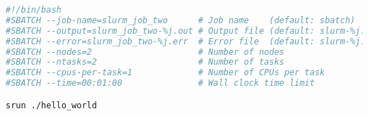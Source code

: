 \begin{lstlisting}[language=bash, caption=two nodes and tasks sbatch script]
#!/bin/bash
#SBATCH --job-name=slurm_job_two      # Job name    (default: sbatch)
#SBATCH --output=slurm_job_two-%j.out # Output file (default: slurm-%j.out)
#SBATCH --error=slurm_job_two-%j.err  # Error file  (default: slurm-%j.out)
#SBATCH --nodes=2                     # Number of nodes
#SBATCH --ntasks=2                    # Number of tasks
#SBATCH --cpus-per-task=1             # Number of CPUs per task
#SBATCH --time=00:01:00               # Wall clock time limit

srun ./hello_world
\end{lstlisting}

